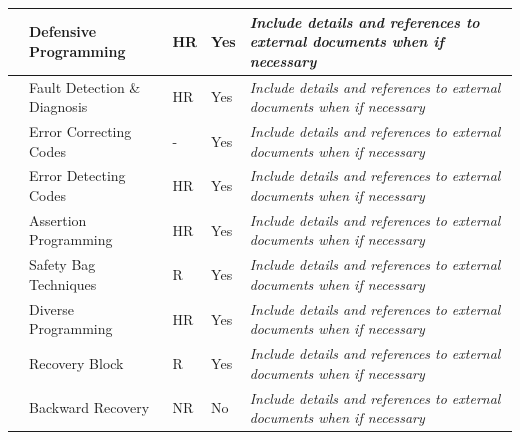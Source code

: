 \documentclass{template/openetcs_article}
\begin{document}
\begin{flushleft}
\begin{supertabular}[H]{|m{1cm}|m{5cm}|m{1cm}|m{2cm}|m{5cm}|}
\hline
{} &
Defensive Programming &
\centering
HR &
\centering
Yes &
\textit{Include details and references to external documents when if necessary}\\\hline
{} &
Fault Detection \& Diagnosis &
\centering
HR &
\centering
Yes &
\textit{Include details and references to external documents when if necessary}\\\hline
{} &
Error Correcting Codes &
\centering
- &
\centering
Yes &
\textit{Include details and references to external documents when if necessary}\\\hline
{} &
Error Detecting Codes &
\centering
HR &
\centering
Yes &
\textit{Include details and references to external documents when if necessary}\\\hline
{} &
Assertion Programming &
\centering
HR &
\centering
Yes &
\textit{Include details and references to external documents when if necessary}\\\hline
{} &
Safety Bag Techniques &
\centering
R &
\centering
Yes &
\textit{Include details and references to external documents when if necessary}\\\hline
{} &
Diverse Programming &
\centering
HR &
\centering
Yes &
\textit{Include details and references to external documents when if necessary}\\\hline
{} &
Recovery Block &
\centering
R &
\centering
Yes &
\textit{Include details and references to external documents when if necessary}\\\hline
{} &
Backward Recovery &
\centering
NR &
\centering
No &
\textit{Include details and references to external documents when if necessary}\\\hline

\end{supertabular}
\end{flushleft}
\end{document}
